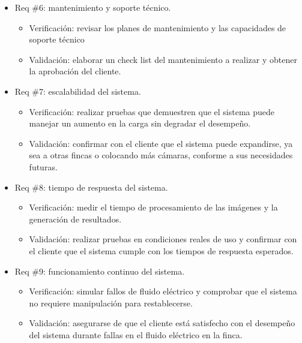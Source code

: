 \documentclass[
11pt, %
]{charter}
\begin{document}
\begin{itemize} 
\item Req \#6: mantenimiento y soporte técnico.
	\begin{itemize}
	\item Verificación: revisar los planes de mantenimiento y las capacidades de soporte técnico
	\item Validación: elaborar un check list del mantenimiento a realizar y obtener la aprobación del cliente.
	\end{itemize}
\end{itemize}

\begin{itemize} 
\item Req \#7: escalabilidad del sistema.
	\begin{itemize}
	\item Verificación: realizar pruebas que demuestren que el sistema puede manejar un aumento en la carga sin degradar el desempeño.
	\item Validación: confirmar con el cliente que el sistema puede expandirse, ya sea a otras fincas o colocando más cámaras, conforme a sus necesidades futuras.
	\end{itemize}
\end{itemize}

\begin{itemize} 
\item Req \#8: tiempo de respuesta del sistema.
	\begin{itemize}
	\item Verificación: medir el tiempo de procesamiento de las imágenes y la generación de resultados. 
	\item Validación: realizar pruebas en condiciones reales de uso y confirmar con el cliente que el sistema cumple con los tiempos de respuesta esperados.
	\end{itemize}
\end{itemize}

\begin{itemize} 
\item Req \#9: funcionamiento continuo del sistema.
	\begin{itemize}
	\item Verificación: simular fallos de fluido eléctrico y comprobar que el sistema no requiere manipulación para restablecerse.
	\item Validación: asegurarse de que el cliente está satisfecho con el desempeño del sistema durante fallas en el fluido eléctrico  en la finca.
	\end{itemize}
\end{itemize}
\end{document}
